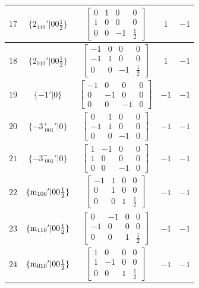 \documentclass[fleqn,8pt]{jsarticle}
\begin{document}
\begin{longtable}{ccccc}
$ 17 $ & $ \{2{}_{110}{}'|0 0 \frac{1}{2}\} $ & $ \begin{bmatrix} 0 & 1 & 0 & 0 \\ 1 & 0 & 0 & 0 \\ 0 & 0 & -1 & \frac{1}{2} \end{bmatrix} $ & $ 1 $ & $ -1 $ \\ \hline
$ 18 $ & $ \{2{}_{010}{}'|0 0 \frac{1}{2}\} $ & $ \begin{bmatrix} -1 & 0 & 0 & 0 \\ -1 & 1 & 0 & 0 \\ 0 & 0 & -1 & \frac{1}{2} \end{bmatrix} $ & $ 1 $ & $ -1 $ \\ \hline
$ 19 $ & $ \{-1{}'|0\} $ & $ \begin{bmatrix} -1 & 0 & 0 & 0 \\ 0 & -1 & 0 & 0 \\ 0 & 0 & -1 & 0 \end{bmatrix} $ & $ -1 $ & $ -1 $ \\ \hline
$ 20 $ & $ \{-3^{+}_{\,\,001}{}'|0\} $ & $ \begin{bmatrix} 0 & 1 & 0 & 0 \\ -1 & 1 & 0 & 0 \\ 0 & 0 & -1 & 0 \end{bmatrix} $ & $ -1 $ & $ -1 $ \\ \hline
$ 21 $ & $ \{-3^{-}_{\,\,001}{}'|0\} $ & $ \begin{bmatrix} 1 & -1 & 0 & 0 \\ 1 & 0 & 0 & 0 \\ 0 & 0 & -1 & 0 \end{bmatrix} $ & $ -1 $ & $ -1 $ \\ \hline
$ 22 $ & $ \{{\rm m}_{100}{}'|0 0 \frac{1}{2}\} $ & $ \begin{bmatrix} -1 & 1 & 0 & 0 \\ 0 & 1 & 0 & 0 \\ 0 & 0 & 1 & \frac{1}{2} \end{bmatrix} $ & $ -1 $ & $ -1 $ \\ \hline
$ 23 $ & $ \{{\rm m}_{110}{}'|0 0 \frac{1}{2}\} $ & $ \begin{bmatrix} 0 & -1 & 0 & 0 \\ -1 & 0 & 0 & 0 \\ 0 & 0 & 1 & \frac{1}{2} \end{bmatrix} $ & $ -1 $ & $ -1 $ \\ \hline
$ 24 $ & $ \{{\rm m}_{010}{}'|0 0 \frac{1}{2}\} $ & $ \begin{bmatrix} 1 & 0 & 0 & 0 \\ 1 & -1 & 0 & 0 \\ 0 & 0 & 1 & \frac{1}{2} \end{bmatrix} $ & $ -1 $ & $ -1 $ \\
\end{longtable}
\end{document}
